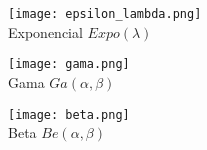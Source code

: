 \begin{figure}[H]\centering
\begin{subfigure}[t]{.3\textwidth}\texttt{[image: epsilon\_lambda.png]}\centering\\Exponencial $Expo(\lambda)$\end{subfigure}\quad
\begin{subfigure}[t]{.3\textwidth}\texttt{[image: gama.png]}\centering\\Gama $Ga(\alpha,\beta)$\end{subfigure}\quad
\begin{subfigure}[t]{.3\textwidth}\texttt{[image: beta.png]}\centering\\Beta $Be(\alpha,\beta)$\end{subfigure}
\end{figure}




